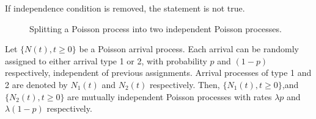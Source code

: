\documentclass[a4paper,10pt,english]{article}
\begin{document}
\begin{rem}If independence condition is removed, the statement is not true.
\end{rem}
\begin{figure}[hhhh]
\center
  
 \caption{Splitting a Poisson process into two independent Poisson processes.}
\label{Fig:IndependentSplitting}
\end{figure}

\begin{thm} Let $\{N(t), t \geqslant 0\}$ be a Poisson arrival process. Each arrival can be randomly assigned to either arrival type 1 or 2, with probability $p$ and $(1-p)$ respectively, independent of previous assignments. Arrival processes of type 1 and 2 are denoted by $N_1(t)$ and $N_2(t)$ respectively. Then, $\{N_{1}(t), t \geqslant 0\}$,and $\{N_{2}(t), t \geqslant 0\}$ are mutually independent Poisson processes with rates $\lambda p$ and $\lambda (1-p)$ respectively.  
\end{thm}
\end{document}
